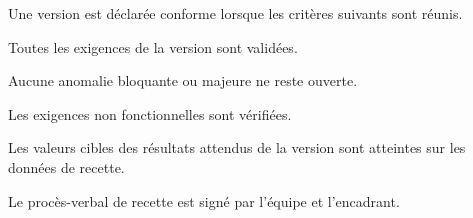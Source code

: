 Une version est déclarée conforme lorsque les critères suivants sont réunis.

\begin{cdcitems}
  \item Toutes les exigences \prioMust{} de la version sont validées.
  \item Aucune anomalie bloquante ou majeure ne reste ouverte.
  \item Les exigences non fonctionnelles \prioMust{} sont vérifiées.
  \item Les valeurs cibles des résultats attendus de la version sont atteintes sur les données de recette.
  \item Le procès-verbal de recette est signé par l’équipe et l’encadrant.
\end{cdcitems}
